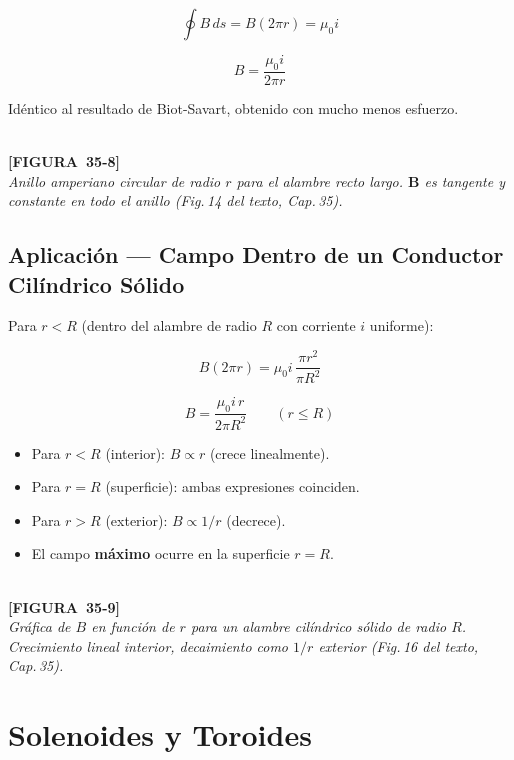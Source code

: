 \documentclass[12pt, letterpaper]{report}
\numberwithin{equation}{section}
\newcommand{\vB}[1]{\boldsymbol{#1}}          %
\newcommand{\figplaceholder}[2]{%
  \begin{tcolorbox}[figbox]
    \centering
    \textcolor{NavyBlue!50}{\rule{0pt}{2.8cm}}\\[4pt]
    {\small\color{NavyBlue}\textbf{[FIGURA\ #1]}\\[2pt]
    \textit{#2}}
  \end{tcolorbox}
}
\begin{document}
\[
  \oint B\,ds = B(2\pi r) = \mu_0 i
\]

\begin{equation}
  \boxed{B = \frac{\mu_0 i}{2\pi r}}
  \label{eq:Bext_alambre}
\end{equation}

Idéntico al resultado de Biot-Savart, obtenido con mucho menos esfuerzo.

\figplaceholder{35-8}{Anillo amperiano circular de radio $r$ para el alambre recto
largo. $\vB{B}$ es tangente y constante en todo el anillo
(Fig.\,14 del texto, Cap.\,35).}

\subsection{Aplicación — Campo Dentro de un Conductor Cilíndrico Sólido}

Para $r<R$ (dentro del alambre de radio $R$ con corriente $i$ uniforme):

\[
  B(2\pi r) = \mu_0 i\,\frac{\pi r^2}{\pi R^2}
\]

\begin{equation}
  \boxed{B = \frac{\mu_0 i\,r}{2\pi R^2}} \qquad (r\le R)
  \label{eq:Bint_alambre}
\end{equation}

\begin{tcolorbox}[propbox, title=Campo magnético dentro y fuera del alambre]
  \begin{itemize}[leftmargin=1.5em, itemsep=2pt]
    \item Para $r<R$ (interior): $B\propto r$ (crece linealmente).
    \item Para $r=R$ (superficie): ambas expresiones coinciden.
    \item Para $r>R$ (exterior): $B\propto 1/r$ (decrece).
    \item El campo \textbf{máximo} ocurre en la superficie $r=R$.
  \end{itemize}
\end{tcolorbox}

\figplaceholder{35-9}{Gráfica de $B$ en función de $r$ para un alambre cilíndrico
sólido de radio $R$. Crecimiento lineal interior, decaimiento como $1/r$
exterior (Fig.\,16 del texto, Cap.\,35).}

\section{Solenoides y Toroides}
\end{document}
